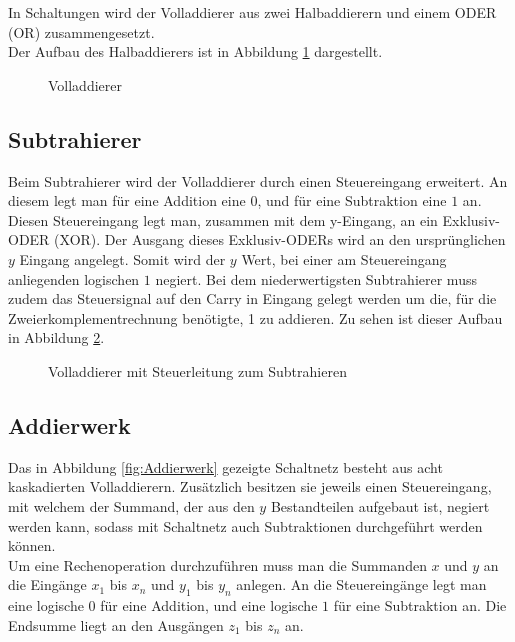 \documentclass[a4paper,12pt,fleqn,oneside]{article}
\begin{document}
		\noindent
		In Schaltungen wird der Volladdierer aus zwei Halbaddierern und einem ODER (OR) zusammengesetzt.\\
		Der Aufbau des Halbaddierers ist in Abbildung \ref{fig:volladdierer} dargestellt.

		\begin{figure}[h]
			\center
			
			\caption{Volladdierer}
			\label{fig:volladdierer}
		\end{figure}

\newpage

	\subsection{Subtrahierer}
		Beim Subtrahierer wird der Volladdierer durch einen Steuereingang erweitert. An diesem legt man für eine Addition eine
		$0$, und für eine Subtraktion eine $1$ an. Diesen Steuereingang legt man, zusammen mit dem y-Eingang, an ein
		Exklusiv-ODER (XOR). Der Ausgang dieses Exklusiv-ODERs wird an den ursprünglichen $y$ Eingang angelegt. Somit wird
		der $y$ Wert, bei einer am Steuereingang anliegenden logischen $1$ negiert. Bei dem niederwertigsten Subtrahierer muss
		zudem das Steuersignal auf den Carry in Eingang gelegt werden um die, für die Zweierkomplementrechnung benötigte, 1
		zu addieren. Zu sehen ist dieser Aufbau in Abbildung \ref{fig:steuerbarer_volladdierer}.

		\begin{figure}[h]
			\center
			
			\caption{Volladdierer mit Steuerleitung zum Subtrahieren}
			\label{fig:steuerbarer_volladdierer}
		\end{figure}



\newpage

	\subsection{Addierwerk}
		Das in Abbildung \ref{fig:Addierwerk} gezeigte Schaltnetz besteht aus acht kaskadierten Volladdierern. Zusätzlich besitzen
		sie jeweils einen Steuereingang, mit welchem der Summand, der aus den $y$ Bestandteilen aufgebaut ist, negiert werden
		kann, sodass mit Schaltnetz auch Subtraktionen durchgeführt werden können.\\
		Um eine Rechenoperation durchzuführen muss man die Summanden $x$ und $y$ an die Eingänge $x_1$ bis $x_n$ und
		$y_1$ bis $y_n$ anlegen. An die Steuereingänge legt man eine logische $0$ für eine Addition, und eine logische $1$ für
		eine Subtraktion an. Die Endsumme liegt an den Ausgängen $z_1$ bis $z_n$ an.
\end{document}
